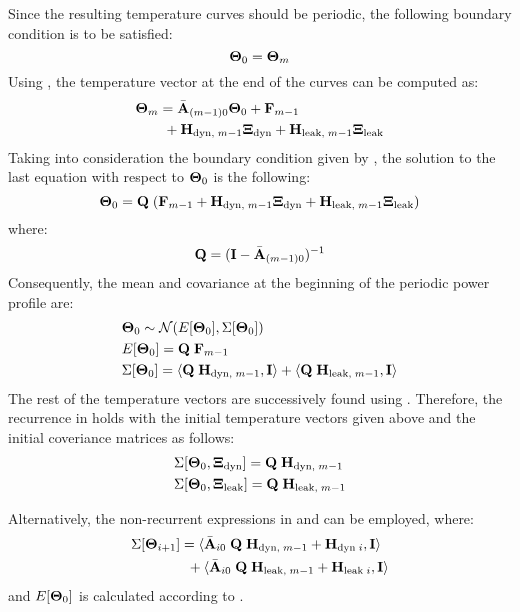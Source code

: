 Since the resulting temperature curves should be periodic, the following boundary condition is to be satisfied:
\begin{equation} \equlabel{dss-boundary}
  \vtemp_0 = \vtemp_{\stepcount}
\end{equation}
Using , the temperature vector at the end of the curves can be computed as:
\begin{align*}
  & \mathbf{\Theta}_{m} = \Bar{\mathbf{A}}_{(m - 1)0} \mathbf{\Theta}_0 + \mathbf{F}_{m - 1} \\
  & { } \qquad + \mathbf{H}_{\text{dyn}, \; m - 1} \mathbf{\Xi}_{\text{dyn}} + \mathbf{H}_{\text{leak}, \; m - 1} \mathbf{\Xi}_{\text{leak}}
\end{align*}
Taking into consideration the boundary condition given by , the solution to the last equation with respect to $\mathbf{\Theta}_0$ is the following:
\[
  \mathbf{\Theta}_0 = \mathbf{Q} \; (\mathbf{F}_{m - 1} + \mathbf{H}_{\text{dyn}, \; m - 1} \mathbf{\Xi}_{\text{dyn}} + \mathbf{H}_{\text{leak}, \; m - 1} \mathbf{\Xi}_{\text{leak}})
\]
where:
\begin{equation} \equlabel{q}
  \m{Q} = (\mone - \am{A}_{(\stepcount - 1)0})^{-1}
\end{equation}
Consequently, the mean and covariance at the beginning of the periodic power profile are:
\begin{align}
  & \vtemp_0 \sim \normal(\expect{\vtemp_0}, \cov{\vtemp_0}) \equlabel{dssta-initial-temperature-process-variation} \\
  & \expect{\vtemp_0} = \m{Q} \; \v{F}_{\stepcount - 1} \nonumber \\
  & \cov{\vtemp_0} = \dbl{\m{Q} \; \v{H}_{\dyn, \; \stepcount - 1}, \mone} + \dbl{\m{Q} \; \v{H}_{\leak, \; \stepcount - 1}, \mone} \nonumber
\end{align}
The rest of the temperature vectors are successively found using . Therefore, the recurrence in  holds with the initial temperature vectors given above and the initial coveriance matrices as follows:
\begin{align*}
  & \Sigma[\mathbf{\Theta}_0, \mathbf{\Xi}_{\text{dyn}}] = \mathbf{Q} \; \mathbf{H}_{\text{dyn}, \; m - 1} \\
  & \Sigma[\mathbf{\Theta}_0, \mathbf{\Xi}_{\text{leak}}] = \mathbf{Q} \; \mathbf{H}_{\text{leak}, \; m - 1}
\end{align*}

Alternatively, the non-recurrent expressions in  and  can be employed, where:
\begin{align*}
  & \Sigma[\mathbf{\Theta}_{i + 1}] = \langle \Bar{\mathbf{A}}_{i0} \; \mathbf{Q} \; \mathbf{H}_{\text{dyn}, \; m - 1} + \mathbf{H}_{\text{dyn} \; i}, \mathbf{I} \rangle \\
  & { } \qquad \qquad + \langle \Bar{\mathbf{A}}_{i0} \; \mathbf{Q} \; \mathbf{H}_{\text{leak}, \; m - 1} + \mathbf{H}_{\text{leak} \; i}, \mathbf{I} \rangle
\end{align*}
and $E[\mathbf{\Theta}_0]$ is calculated according to .
